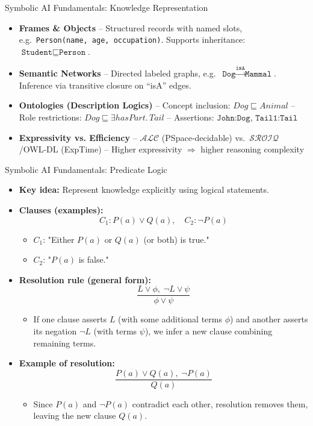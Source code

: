 \documentclass[german,10pt]{beamer}
\begin{document}
\begin{frame}{Symbolic AI Fundamentals: Knowledge Representation}
  \begin{itemize}
    \item \textbf{Frames \& Objects}  
      – Structured records with named slots, e.g.\ \texttt{Person(name, age, occupation)}.  
      Supports inheritance: \(\texttt{Student}\sqsubseteq\texttt{Person}\).
    \item \textbf{Semantic Networks}  
      – Directed labeled graphs, e.g.\ \(\texttt{Dog}\xrightarrow{\texttt{isA}}\texttt{Mammal}\).  
      Inference via transitive closure on “isA” edges.
    \item \textbf{Ontologies (Description Logics)}  
      – Concept inclusion: \(Dog\sqsubseteq Animal\)  
      – Role restrictions: \(Dog\sqsubseteq \exists hasPart.\,Tail\)  
      – Assertions: \(\texttt{John:Dog}\), \(\texttt{Tail1:Tail}\)
    \item \textbf{Expressivity vs. Efficiency}  
      – \(\mathcal{ALC}\) (PSpace‐decidable) vs.\ \(\mathcal{SROIQ}\)/OWL‑DL (ExpTime)  
      – Higher expressivity $\Rightarrow$ higher reasoning complexity
  \end{itemize}
\end{frame}



\begin{frame}{Symbolic AI Fundamentals: Predicate Logic}
  \begin{itemize}
    \item \textbf{Key idea:} Represent knowledge explicitly using logical statements.
    
    \item \textbf{Clauses (examples):}
    \[
      C_1: P(a) \lor Q(a), \quad C_2: \neg P(a)
    \]
    \begin{itemize}
      \item \(C_1\): "Either \(P(a)\) or \(Q(a)\) (or both) is true."
      \item \(C_2\): "\(P(a)\) is false."
    \end{itemize}
    
    \item \textbf{Resolution rule (general form):}
    \[
      \frac{L \lor \phi,\;\neg L \lor \psi}{\phi \lor \psi}
    \]
    \begin{itemize}
      \item If one clause asserts \(L\) (with some additional terms \(\phi\)) and another asserts its negation \(\neg L\) (with terms \(\psi\)), we infer a new clause combining remaining terms.
    \end{itemize}
    
    \item \textbf{Example of resolution:}
    \[
      \frac{P(a)\lor Q(a),\;\neg P(a)}{Q(a)}
    \]
    \begin{itemize}
      \item Since \(P(a)\) and \(\neg P(a)\) contradict each other, resolution removes them, leaving the new clause \(Q(a)\).
    \end{itemize}
  \end{itemize}
\end{frame}
\end{document}
